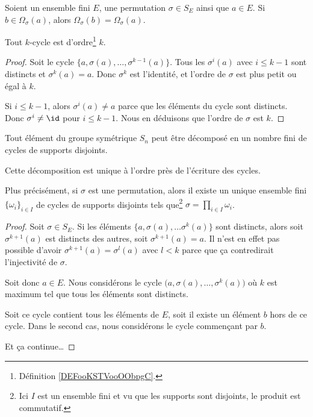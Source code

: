 \begin{lemma}       \label{LEMooMIHGooQfALbc}
	Soient un ensemble fini \( E\), une permutation \( \sigma\in S_E\) ainsi que \( a\in E\). Si \( b\in \Omega_{\sigma}(a)\), alors \( \Omega_{\sigma}(b)=\Omega_{\sigma}(a)\).
\end{lemma}


\begin{lemma}		\label{LEMooGWZNooXFezrg}
	Tout \( k\)-cycle est d'ordre\footnote{Définition \ref{DEFooKSTVooOObpgC}.} \( k\).
\end{lemma}

\begin{proof}
	Soit le cycle \( \{ a,\sigma(a),\ldots, \sigma^{k-1}(a) \}\). Tous les \( \sigma^i(a)\) avec \( i\leq k-1\) sont distincts et \( \sigma^k(a)=a\). Donc \( \sigma^k\) est l'identité, et l'ordre de \( \sigma\) est plus petit ou égal à \( k\).

	Si \( i\leq k-1\), alors \( \sigma^i(a)\neq a\) parce que les éléments du cycle sont distincts. Donc \( \sigma^i\neq \id\) pour \( i\leq k-1\). Nous en déduisons que l'ordre de \( \sigma\) est \( k\).
\end{proof}


\begin{lemma}       \label{LEMooQLSAooBrXDXw}
	Tout élément du groupe symétrique \( S_n\) peut être décomposé en un nombre fini de cycles de supports disjoints.

	Cette décomposition est unique à l'ordre près de l'écriture des cycles.

	Plus précisément, si \( \sigma\) est une permutation, alors il existe un unique ensemble fini \( \{ \omega_i \}_{i\in I}\) de cycles de supports disjoints tels que\footnote{Ici \( I\) est un ensemble fini et vu que les supports sont disjoints, le produit est commutatif.} \( \sigma=\prod_{i\in I}\omega_i\).
\end{lemma}

\begin{proof}
	Soit \( \sigma\in S_E\). Si les éléments \( \{ a,\sigma(a), \ldots \sigma^k(a)\}\) sont distincts, alors soit \( \sigma^{k+1}(a)\) est distincts des autres, soit \( \sigma^{k+1}(a)=a\). Il n'est en effet pas possible d'avoir \( \sigma^{k+1}(a)=\sigma^l(a)\) avec \( l<k\) parce que ça contredirait l'injectivité de \( \sigma\).

	Soit donc \( a\in E\). Nous considérons le cycle \( \big( a,\sigma(a),\ldots, \sigma^k(a) \big)\) où \( k\) est maximum tel que tous les éléments sont distincts.

	Soit ce cycle contient tous les éléments de \( E\), soit il existe un élément \( b\) hors de ce cycle. Dans le second cas, nous considérons le cycle commençant par \( b\).

	Et ça continue\ldots
\end{proof}


